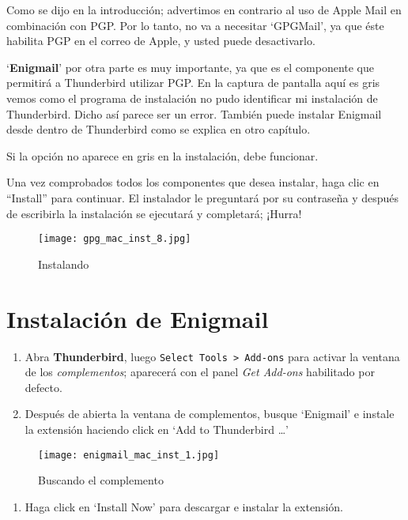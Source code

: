 \documentclass[10pt,a5paper,twoside,,]{book}
\providecommand{\tightlist}{%
  \setlength{\itemsep}{0pt}\setlength{\parskip}{0pt}}
\begin{document}
Como se dijo en la introducción; advertimos en contrario al uso de Apple
Mail en combinación con PGP. Por lo tanto, no va a necesitar `GPGMail',
ya que éste habilita PGP en el correo de Apple, y usted puede
desactivarlo.

`\textbf{Enigmail}' por otra parte es muy importante, ya que es el
componente que permitirá a Thunderbird utilizar PGP. En la captura de
pantalla aquí es gris vemos como el programa de instalación no pudo
identificar mi instalación de Thunderbird. Dicho así parece ser un
error. También puede instalar Enigmail desde dentro de Thunderbird como
se explica en otro capítulo.

Si la opción no aparece en gris en la instalación, debe funcionar.

Una vez comprobados todos los componentes que desea instalar, haga clic
en ``Install'' para continuar. El instalador le preguntará por su
contraseña y después de escribirla la instalación se ejecutará y
completará; ¡Hurra!

\begin{figure}[htbp]
\centering
\texttt{[image: gpg\_mac\_inst\_8.jpg]}
\caption{Instalando}
\end{figure}

\section{Instalación de Enigmail}\label{instalaciuxf3n-de-enigmail}

\begin{enumerate}
\def\labelenumi{\arabic{enumi}.}
\item
  Abra \textbf{Thunderbird}, luego
  \texttt{Select\ Tools\ \textgreater{}\ Add-ons} para activar la
  ventana de los \emph{complementos}; aparecerá con el panel \emph{Get
  Add-ons} habilitado por defecto.
\item
  Después de abierta la ventana de complementos, busque `Enigmail' e
  instale la extensión haciendo click en `Add to Thunderbird \ldots{}'
\end{enumerate}

\begin{figure}[htbp]
\centering
\texttt{[image: enigmail\_mac\_inst\_1.jpg]}
\caption{Buscando el complemento}
\end{figure}

\begin{enumerate}
\def\labelenumi{\arabic{enumi}.}
\setcounter{enumi}{2}
\tightlist
\item
  Haga click en `Install Now' para descargar e instalar la extensión.
\end{enumerate}
\end{document}
